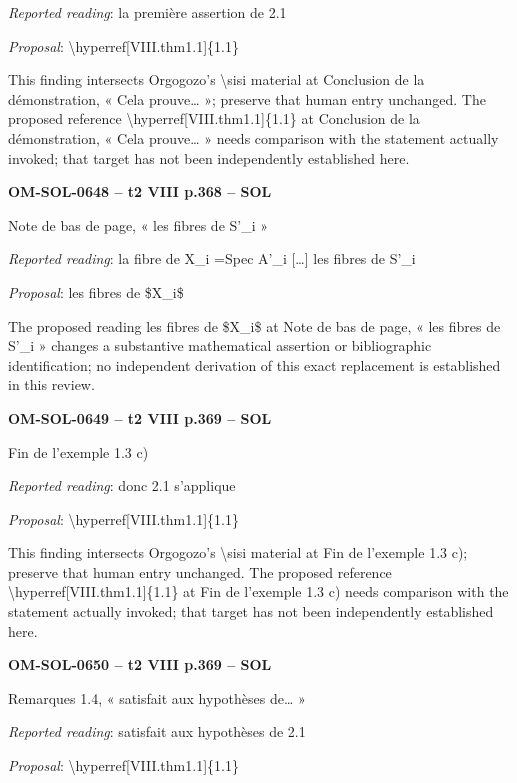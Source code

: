 \emph{Reported reading}: la première assertion de 2.1\par
\emph{Proposal}: \textbackslash{}hyperref[VIII.thm1.1]\{1.1\}\par
This finding intersects Orgogozo's \textbackslash{}sisi material at Conclusion de la démonstration, « Cela prouve… »; preserve that human entry unchanged. The proposed reference \textbackslash{}hyperref[VIII.thm1.1]\{1.1\} at Conclusion de la démonstration, « Cela prouve… » needs comparison with the statement actually invoked; that target has not been independently established here.\par
\par\noindent\textbf{OM-SOL-0648 -- t2 VIII p.368 -- SOL}\par
Note de bas de page, « les fibres de S'\_i »\par
\emph{Reported reading}: la fibre de X\_i =\allowbreak  Spec A'\_i […] les fibres de S'\_i\par
\emph{Proposal}: les fibres de \$X\_i\$\par
The proposed reading les fibres de \$X\_i\$ at Note de bas de page, « les fibres de S'\_i » changes a substantive mathematical assertion or bibliographic identification; no independent derivation of this exact replacement is established in this review.\par
\par\noindent\textbf{OM-SOL-0649 -- t2 VIII p.369 -- SOL}\par
Fin de l'exemple 1.3 c)\par
\emph{Reported reading}: donc 2.1 s'applique\par
\emph{Proposal}: \textbackslash{}hyperref[VIII.thm1.1]\{1.1\}\par
This finding intersects Orgogozo's \textbackslash{}sisi material at Fin de l'exemple 1.3 c); preserve that human entry unchanged. The proposed reference \textbackslash{}hyperref[VIII.thm1.1]\{1.1\} at Fin de l'exemple 1.3 c) needs comparison with the statement actually invoked; that target has not been independently established here.\par
\par\noindent\textbf{OM-SOL-0650 -- t2 VIII p.369 -- SOL}\par
Remarques 1.4, « satisfait aux hypothèses de… »\par
\emph{Reported reading}: satisfait aux hypothèses de 2.1\par
\emph{Proposal}: \textbackslash{}hyperref[VIII.thm1.1]\{1.1\}\par
